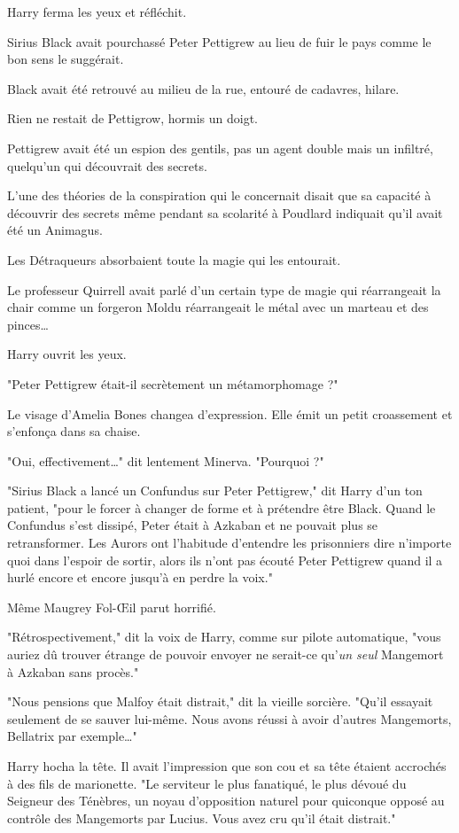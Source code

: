 Harry ferma les yeux et réfléchit.

Sirius Black avait pourchassé Peter Pettigrew au lieu de fuir le pays comme le bon sens le suggérait.

Black avait été retrouvé au milieu de la rue, entouré de cadavres, hilare.

Rien ne restait de Pettigrow, hormis un doigt.

Pettigrew avait été un espion des gentils, pas un agent double mais un infiltré, quelqu'un qui découvrait des secrets.

L'une des théories de la conspiration qui le concernait disait que sa capacité à découvrir des secrets même pendant sa scolarité à Poudlard indiquait qu'il avait été un Animagus.

Les Détraqueurs absorbaient toute la magie qui les entourait.

Le professeur Quirrell avait parlé d'un certain type de magie qui réarrangeait la chair comme un forgeron Moldu réarrangeait le métal avec un marteau et des pinces…

Harry ouvrit les yeux.

"Peter Pettigrew était-il secrètement un métamorphomage ?"

Le visage d'Amelia Bones changea d'expression. Elle émit un petit croassement et s'enfonça dans sa chaise.

"Oui, effectivement…" dit lentement Minerva. "Pourquoi ?"

"Sirius Black a lancé un Confundus sur Peter Pettigrew," dit Harry d'un ton patient, "pour le forcer à changer de forme et à prétendre être Black. Quand le Confundus s'est dissipé, Peter était à Azkaban et ne pouvait plus se retransformer. Les Aurors ont l'habitude d'entendre les prisonniers dire n'importe quoi dans l'espoir de sortir, alors ils n'ont pas écouté Peter Pettigrew quand il a hurlé encore et encore jusqu'à en perdre la voix."

Même Maugrey Fol-Œil parut horrifié.

"Rétrospectivement," dit la voix de Harry, comme sur pilote automatique, "vous auriez dû trouver étrange de pouvoir envoyer ne serait-ce qu'\emph{un seul}  Mangemort à Azkaban sans procès."

"Nous pensions que Malfoy était distrait," dit la vieille sorcière. "Qu'il essayait seulement de se sauver lui-même. Nous avons réussi à avoir d'autres Mangemorts, Bellatrix par exemple…"

Harry hocha la tête. Il avait l'impression que son cou et sa tête étaient accrochés à des fils de marionette. "Le serviteur le plus fanatiqué, le plus dévoué du Seigneur des Ténèbres, un noyau d'opposition naturel pour quiconque opposé au contrôle des Mangemorts par Lucius. Vous avez cru qu'il était distrait."

